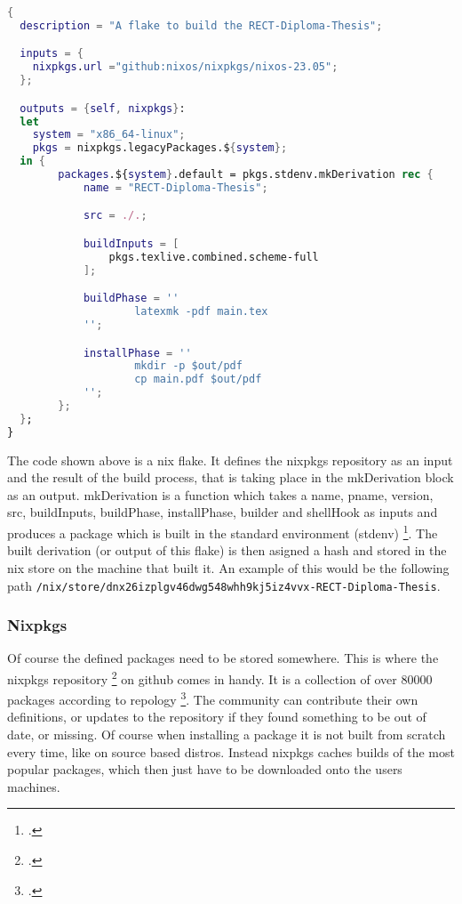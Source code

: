 \begin{minipage}{\textwidth}
\begin{lstlisting}[language=Nix, caption={The nix flake, that builds this diploma thesis}]
{
  description = "A flake to build the RECT-Diploma-Thesis";

  inputs = {
    nixpkgs.url ="github:nixos/nixpkgs/nixos-23.05";
  };

  outputs = {self, nixpkgs}:
  let
    system = "x86_64-linux";
    pkgs = nixpkgs.legacyPackages.${system};
  in {
		packages.${system}.default = pkgs.stdenv.mkDerivation rec {
			name = "RECT-Diploma-Thesis";

			src = ./.;

			buildInputs = [
				pkgs.texlive.combined.scheme-full
			];

			buildPhase = ''
					latexmk -pdf main.tex
			'';

			installPhase = '' 
					mkdir -p $out/pdf
					cp main.pdf $out/pdf
			'';
		};
  };
}
\end{lstlisting}
\end{minipage}

The code shown above is a nix flake. It defines the nixpkgs repository as an input and the result of the build process,
that is taking place in the mkDerivation block as an output. mkDerivation is a function which takes a name, pname, version, src,
buildInputs, buildPhase, installPhase, builder and shellHook as inputs and produces a package which is built in the standard environment (stdenv) \footcite{nixMkDerivation}.
The built derivation (or output of this flake) is then asigned a hash and stored in the nix store on the machine that built it.
An example of this would be the following path \newline\verb+/nix/store/dnx26izplgv46dwg548whh9kj5iz4vvx-RECT-Diploma-Thesis+. 

\subsubsection{Nixpkgs}
Of course the defined packages need to be stored somewhere. This is where the nixpkgs repository \footcite{nixpkgs_repo} on github comes in handy. It is a collection of over 80000 packages according to repology \footcite{repology_nixpkgs}.
The community can contribute their own definitions, or updates to the repository if they found something to be out of date, or missing. Of course when installing a package it is not built from scratch every time, like on source based distros.
Instead nixpkgs caches builds of the most popular packages, which then just have to be downloaded onto the users machines.

